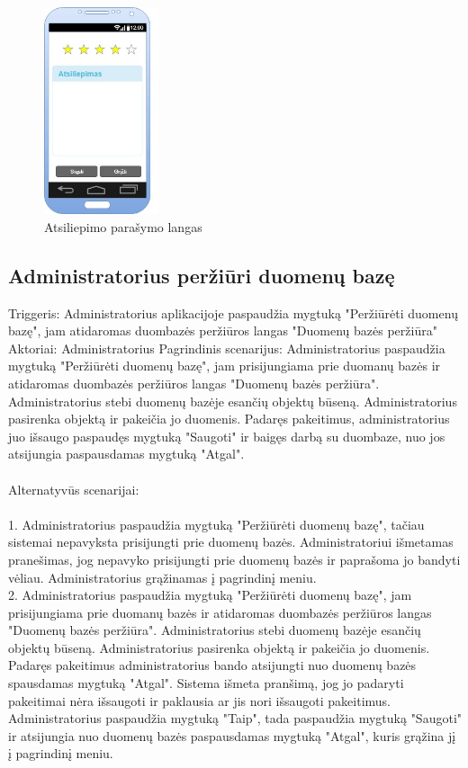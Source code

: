 \documentclass[oneside]{VUMIFPSkursinis}
\begin{document}
\begin{figure}[h]
    \centering
    \includegraphics[width=0.30\textwidth]{GUI13.jpg}
    \caption{Atsiliepimo parašymo langas}
    \label{fig:atsiliepimas}
\end{figure}


\subsection{Administratorius peržiūri duomenų bazę}
	Triggeris: Administratorius aplikacijoje paspaudžia mygtuką "Peržiūrėti duomenų bazę", jam atidaromas duombazės peržiūros langas "Duomenų bazės peržiūra"
	Aktoriai: Administratorius
	Pagrindinis scenarijus: Administratorius paspaudžia mygtuką "Peržiūrėti duomenų bazę", jam prisijungiama prie duomanų bazės ir atidaromas duombazės peržiūros langas "Duomenų bazės peržiūra". Administratorius stebi duomenų bazėje esančių objektų būseną. Administratorius pasirenka objektą ir pakeičia jo duomenis. Padaręs pakeitimus, administratorius juo išsaugo paspaudęs mygtuką "Saugoti" ir baigęs darbą su duombaze, nuo jos atsijungia paspausdamas mygtuką "Atgal". \\ \\
	Alternatyvūs scenarijai:  \\ \\ 
1. Administratorius paspaudžia mygtuką "Peržiūrėti duomenų bazę", tačiau sistemai nepavyksta prisijungti prie duomenų bazės. Administratoriui išmetamas pranešimas, jog nepavyko prisijungti prie duomenų bazės ir paprašoma jo bandyti vėliau. Administratorius grąžinamas į pagrindinį meniu. \\
2. Administratorius paspaudžia mygtuką "Peržiūrėti duomenų bazę", jam prisijungiama prie duomanų bazės ir atidaromas duombazės peržiūros langas "Duomenų bazės peržiūra". Administratorius stebi duomenų bazėje esančių objektų būseną. Administratorius pasirenka objektą ir pakeičia jo duomenis. Padaręs pakeitimus administratorius bando atsijungti nuo duomenų bazės spausdamas mygtuką "Atgal". Sistema išmeta pranšimą, jog jo padaryti pakeitimai nėra išsaugoti ir paklausia ar jis nori išsaugoti pakeitimus. Administratorius paspaudžia mygtuką "Taip", tada paspaudžia mygtuką "Saugoti" ir atsijungia nuo duomenų bazės paspausdamas mygtuką "Atgal", kuris grąžina jį į pagrindinį meniu. \\ \\
\end{document}
